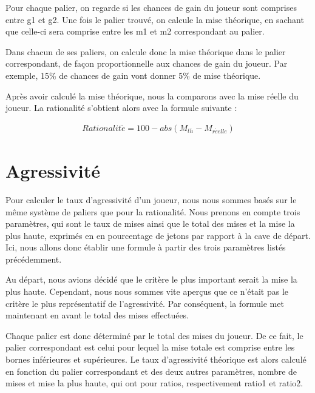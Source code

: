 \documentclass{report}
\begin{document}
Pour chaque palier, on regarde si les chances de gain du joueur sont comprises entre g1 et g2. Une fois le palier trouvé, on calcule la mise théorique, en sachant que celle-ci sera comprise entre les m1 et m2 correspondant au palier. \par
Dans chacun de ses paliers, on calcule donc la mise théorique dans le palier correspondant, de façon proportionnelle aux chances de gain du joueur. Par exemple, 15\% de chances de gain vont donner 5\% de mise théorique.\par
	
Après avoir calculé la mise théorique, nous la comparons avec la mise réelle du joueur. La rationalité s’obtient alors avec la formule suivante : \par

\begin{align*}
Rationalit\acute{e} = 100-abs(M_{th}-M_{r\acute{e}elle})
\end{align*}



\section{Agressivité}

\hspace{0.5cm}Pour calculer le taux d'agressivité d'un joueur, nous nous sommes basés sur le même système de paliers que pour la rationalité. Nous prenons en compte trois paramètres, qui sont le taux de mises ainsi que le total des mises et la mise la plus haute, exprimés en en pourcentage de jetons par rapport à la cave de départ. Ici, nous allons donc établir une formule à partir des trois paramètres listés précédemment.\par

Au départ, nous avions décidé que le critère le plus important serait la mise la plus haute. Cependant, nous nous sommes vite aperçus que ce n'était pas le critère le plus représentatif de l'agressivité. Par conséquent, la formule met maintenant en avant le total des mises effectuées.

Chaque palier est donc déterminé par le total des mises du joueur. De ce fait, le palier correspondant est celui pour lequel la mise totale est comprise entre les bornes inférieures et supérieures. Le taux d'agressivité théorique est alors calculé en fonction du palier correspondant et des deux autres paramètres, nombre de mises et mise la plus haute, qui ont pour ratios, respectivement ratio1 et ratio2. \par
\end{document}
